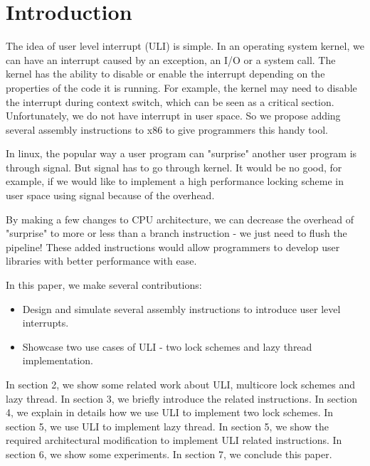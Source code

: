 \section{Introduction}

The idea of user level interrupt (ULI) is simple. In an operating system kernel, we can have an interrupt caused by an exception, an I/O or a system call. The kernel has the ability to disable or enable the interrupt depending on the properties of the code it is running. For example, the kernel may need to disable the interrupt during context switch, which can be seen as a critical section. Unfortunately, we do not have interrupt in user space. So we propose adding several assembly instructions to x86 to give programmers this handy tool.

In linux, the popular way a user program can "surprise" another user program is through signal. But signal has to go through kernel. It would be no good, for example, if we would like to implement a high performance locking scheme in user space using signal because of the overhead.

By making a few changes to CPU architecture, we can decrease the overhead of "surprise" to more or less than a branch instruction - we just need to flush the pipeline! These added instructions would allow programmers to develop user libraries with better performance with ease.

In this paper, we make several contributions:
\begin{itemize}
\item Design and simulate several assembly instructions to introduce user level interrupts.
\item Showcase two use cases of ULI - two lock schemes and lazy thread implementation.
\end{itemize}

In section 2, we show some related work about ULI, multicore lock schemes and lazy thread. In section 3, we briefly introduce the related instructions. In section 4, we explain in details how we use ULI to implement two lock schemes. In section 5, we use ULI to implement lazy thread. In section 5, we show the required architectural modification to implement ULI related instructions. In section 6, we show some experiments. In section 7, we conclude this paper.